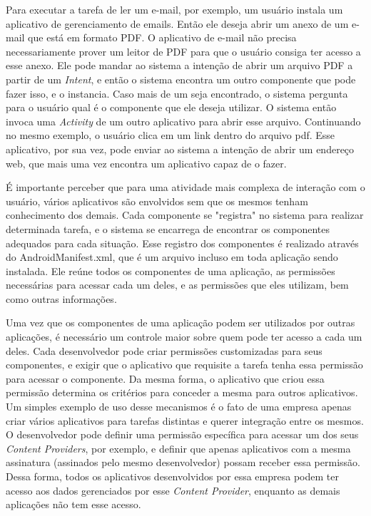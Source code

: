 Para executar a tarefa de ler um e-mail, por exemplo, um usuário instala um aplicativo de gerenciamento de emails. Então ele deseja abrir um anexo de um e-mail que está em formato PDF. O aplicativo de e-mail não precisa necessariamente prover um leitor de PDF para que o usuário consiga ter acesso a esse anexo. Ele pode mandar ao sistema a intenção de abrir um arquivo PDF a partir de um \textit{Intent}, e então o sistema encontra um outro componente que pode fazer isso, e o instancia. Caso mais de um seja encontrado, o sistema pergunta para o usuário qual é o componente que ele deseja utilizar. O sistema então invoca uma \textit{Activity} de um outro aplicativo para abrir esse arquivo. Continuando no mesmo exemplo, o usuário clica em um link dentro do arquivo pdf. Esse aplicativo, por sua vez, pode enviar ao sistema a intenção de abrir um endereço web, que mais uma vez encontra um aplicativo capaz de o fazer.  

É importante perceber que para uma atividade mais complexa de interação com o usuário, vários aplicativos são envolvidos sem que os mesmos tenham conhecimento dos demais. Cada componente se "registra" no sistema para realizar determinada tarefa, e o sistema se encarrega de encontrar os componentes adequados para cada situação. Esse registro dos componentes é realizado através do AndroidManifest.xml, que é um arquivo incluso em toda aplicação sendo instalada. Ele reúne todos os componentes de uma aplicação, as permissões necessárias para acessar cada um deles, e as permissões que eles utilizam, bem como outras informações. 

Uma vez que os componentes de uma aplicação podem ser utilizados por outras aplicações, é necessário um controle maior sobre quem pode ter acesso a cada um deles. Cada desenvolvedor pode criar permissões customizadas para seus componentes, e exigir que o aplicativo que requisite a tarefa tenha essa permissão para acessar o componente. Da mesma forma, o aplicativo que criou essa permissão determina os critérios para conceder a mesma para outros aplicativos. Um simples exemplo de uso desse mecanismos é o fato de uma empresa apenas criar vários aplicativos para tarefas distintas e querer integração entre os mesmos. O desenvolvedor pode definir uma permissão específica para acessar um dos seus \textit{Content Providers}, por exemplo, e definir que apenas aplicativos com a mesma assinatura (assinados pelo mesmo desenvolvedor) possam receber essa permissão. Dessa forma, todos os aplicativos desenvolvidos por essa empresa podem ter acesso aos dados gerenciados por esse \textit{Content Provider}, enquanto as demais aplicações não tem esse acesso. 

